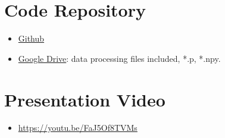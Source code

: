 \documentclass{sigkddExp}
\begin{document}
\section{Code Repository}
\begin{itemize}
       \item \href{https://github.com/fnoya/dlh-project}{Github}
       \item \href{https://drive.google.com/drive/folders/1KMSbvsonOh3s8L902e-ExIgh_IgH0VnV?usp=sharing}{Google Drive}: data processing files included, *.p, *.npy.
\end{itemize}

\section {Presentation Video}
\begin{itemize}
       \item \url{https://youtu.be/FaJ5Of8TVMs }
\end{itemize}
\end{document}
